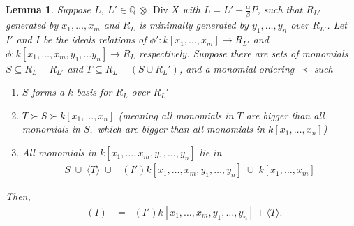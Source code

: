 \documentclass{amsart}
\theoremstyle{plain}
\newtheorem{lem}[thm]{Lemma}
\theoremstyle{definition}
\theoremstyle{remark}
\numberwithin{equation}{section}
\newcommand\BQ{{\mathbb Q}}
\DeclareMathOperator\di{Div}
\newcommand{\halfcan}{L}
\DeclareMathOperator{\initial}{in_\prec}
\begin{document}
\begin{lem}
\label{lem:relations_from_generators_induction} 
Suppose $\halfcan$, $\halfcan' \in \BQ$ $\otimes$ $\di X$ with $\halfcan=\halfcan'+\frac{\alpha}{\beta}P$, such that $R_{\halfcan'}$ generated by $x_1, \ldots, x_m$
and $R_{\halfcan}$ is minimally generated by $y_1, \ldots, y_n$ over 
$R_{\halfcan'}$.  Let $I'$ and $I$ be the ideals relations of $\phi':k[x_1, \ldots, x_m]\to R_{\halfcan'}$ and $\phi:k[x_1, \ldots, x_m, y_1, \ldots y_n]\to R_{\halfcan}$ respectively.
Suppose there are sets of monomials $S\subseteq R_\halfcan-R_{\halfcan'}$ and $T\subseteq R_\halfcan-(S\cup R_\halfcan')$, and a monomial ordering $\prec$ such 
\begin{enumerate}
\item $S$ forms a $k$-basis for $R_\halfcan$ over $R_\halfcan'$
\item $T \succ S\succ k[x_1, \ldots, x_n]$ {\rm(}meaning all monomials in $T$ are bigger than all monomials in $S,$ which are bigger than all monomials in $k[x_1, \ldots, x_n]${\rm)}
\item All monomials in $k[x_1, \ldots, x_m, y_1, \ldots, y_n]$ lie in 
\begin{align*}
	S \; \cup\; \langle T\rangle \; \cup \; \initial(I') k[x_1, \ldots, x_m, y_1, \ldots, y_n] \; \cup \; k[x_1, \ldots, x_m]
\end{align*}
\end{enumerate}
Then,
\begin{align*}
	\initial(I) & = \initial(I') k[x_1, \ldots, x_m, y_1, \ldots, y_n]
	+ \langle T \rangle.
\end{align*}
\end{lem}
\end{document}
